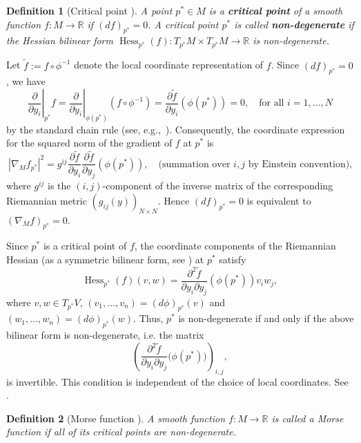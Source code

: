 \documentclass[12pt,reqno]{amsart}
\newtheorem{definition}{Definition}[section]
\newcommand{\red}{\textcolor[rgb]{1.00,0.00,0.00}}
\numberwithin{equation}{section}
\begin{document}
\begin{definition}[Critical point \cite{jmlee}]\label{cp}
A point \(p^* \in M\) is a {\bf{critical point}} of a smooth function \(f: M \to \mathbb{R}\) if \((df)_{p^*} = 0\). A critical point \(p^*\) is called {\bf{non-degenerate}} if the Hessian bilinear form \(\operatorname{Hess}_{p^*}(f): T_{p^*}M \times T_{p^*}M \to \mathbb{R}\) is non-degenerate.
\end{definition}

Let \(\tilde{f} := f \circ \phi^{-1}\) denote the local coordinate representation of \(f\). Since \((df)_{p^*} = 0\), we have
\[
\left.\frac{\partial}{\partial y_{i}}\right\vert_{{p^*}} f
=\left.\frac{\partial}{\partial y_{i}}\right\vert_{\phi({p^*})}(f\circ\phi^{-1})
=\frac{\partial \tilde{f}}{\partial y_{i}}(\phi({p^*}))=0,\quad \text{for all }i=1,\dots,N
\]
by the standard chain rule (see, e.g.,~\cite{jmlee}). Consequently, the coordinate expression for the squared norm of the gradient of \(f\) at \(p^*\) is
\[
|\nabla_M f_{p^*}|^2=g^{ij}\frac{\partial \tilde{f}}{\partial y_{i}}\frac{\partial \tilde{f}}{\partial y_{j}}(\phi({p^*})), \quad \text{(summation over }i,j \text{ by Einstein convention),}
\]
where \(g^{ij}\) is the \((i,j)\)-component of the inverse matrix of the corresponding Riemannian metric \((g_{ij}(y))_{N\times N}\). Hence \((df)_{p^*} = 0\) is equivalent to \((\nabla_M f)_{p^*} = 0\).


Since $p^*$ is a critical point of $f$, the coordinate components of
the Riemannian Hessian (as a symmetric bilinear form, see \cite{morse2024}) at $p^*$ satisfy
\[
\operatorname{Hess}_{p^*}(f)(v,w)
=
\frac{\partial^2\tilde f}
{\partial y_i\partial y_j}
\left(\phi(p^*)\right)v_iw_j,
\]
where $v,w\in T_{p^*}V$, $(v_1,...,v_n)=(d\phi)_{p^*}(v)$ and $(w_1,...,w_n)=(d\phi)_{p^*}(w)$.
Thus, \(p^*\) is non-degenerate if and only if the above bilinear form is non-degenerate, i.e. the matrix
\[
\left(\frac{\partial^2 \tilde f}{\partial y_i \partial y_j}\bigl(\phi(p^*)\bigr)\right)_{i,j},
\]
is invertible. This condition is independent of the choice of local coordinates. See \cite{jmlee}.
\begin{definition}[Morse function \cite{MT}]\label{def:morse}
A smooth function \(f:M\to\mathbb R\) is called a Morse function if
all of its critical points are non-degenerate.
\end{definition}
\end{document}
